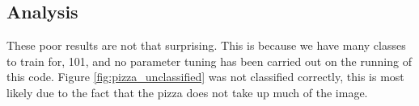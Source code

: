 \tocless\subsection{Analysis}
These poor results are not that surprising.
This is because we have many classes to train for, 101, and no parameter tuning has been carried out on the running of this code.
Figure \ref{fig:pizza_unclassified} was not classified correctly, this is most likely due to the fact that the pizza does not take up much of the image.

\afterpage{\clearpage}
